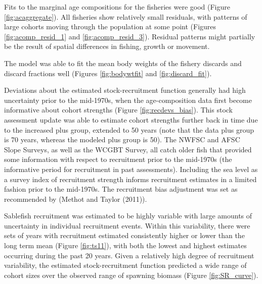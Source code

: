 \documentclass[11pt,
  english,
  a4paper,
]{article}
\begin{document}
\leavevmode\tagmcend\tagstructend\par

Fits to the marginal age compositions for the fisheries were good (Figure \ref{fig:acaggregate}). All fisheries show relatively small residuals, with patterns of large cohorts moving through the population at some point (Figures \ref{fig:acomp_resid_1} and \ref{fig:acomp_resid_3}). Residual patterns might partially be the result of spatial differences in fishing, growth or movement.

The model was able to fit the mean body weights of the fishery discards and discard fractions well (Figures \ref{fig:bodywtfit} and \ref{fig:discard_fit}).

\leavevmode\tagmcend\tagstructend\par


Deviations about the estimated stock-recruitment function generally had high uncertainty prior to the mid-1970s, when the age-composition data first become informative about cohort strengths (Figure \ref{fig:recdevs_bias}). This stock assessment update was able to estimate cohort strengths further back in time due to the increased plus group, extended to 50 years (note that the data plus group is 70 years, whereas the modeled plus group is 50). The NWFSC and AFSC Slope Surveys, as well as the WCGBT Survey, all catch older fish that provided some information with respect to recruitment prior to the mid-1970s (the informative period for recruitment in past assessments). Including the sea level as a survey index of recruitment strength informs recruitment estimates in a limited fashion prior to the mid-1970s. The recruitment bias adjustment was set as recommended by ({Methot and Taylor (2011)\leavevmode\tagmcend\tagstructend}).

\leavevmode\tagmcend\tagstructend\par


Sablefish recruitment was estimated to be highly variable with large amounts of uncertainty in individual recruitment events. Within this variability, there were sets of years with recruitment estimated consistently higher or lower than the long term mean (Figure \ref{fig:ts11}), with both the lowest and highest estimates occurring during the past 20 years. Given a relatively high degree of recruitment variability, the estimated stock-recruitment function predicted a wide range of cohort sizes over the observed range of spawning biomass (Figure \ref{fig:SR_curve}).
\end{document}
